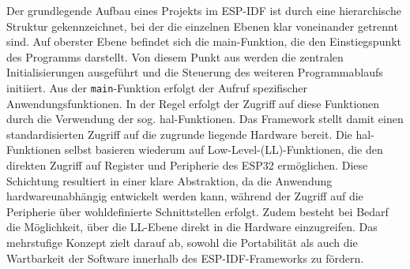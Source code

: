 Der grundlegende Aufbau eines Projekts im ESP-IDF ist durch eine hierarchische Struktur gekennzeichnet, bei der die einzelnen Ebenen klar voneinander getrennt sind.
Auf oberster Ebene befindet sich die main-Funktion, die den Einstiegspunkt des Programms darstellt.
Von diesem Punkt aus werden die zentralen Initialisierungen ausgeführt und die Steuerung des weiteren Programmablaufs initiiert.
Aus der \texttt{main}-Funktion erfolgt der Aufruf spezifischer Anwendungsfunktionen.
In der Regel erfolgt der Zugriff auf diese Funktionen durch die Verwendung der sog. \gls{hal}-Funktionen.
Das Framework stellt damit einen standardisierten Zugriff auf die zugrunde liegende Hardware bereit.
Die \gls{hal}-Funktionen selbst basieren wiederum auf Low-Level-(LL)-Funktionen, die den direkten Zugriff auf Register und Peripherie des ESP32 ermöglichen.
Diese Schichtung resultiert in einer klare Abstraktion, da die Anwendung hardwareunabhängig entwickelt werden kann, während der Zugriff auf die Peripherie über wohldefinierte Schnittstellen erfolgt.
Zudem besteht bei Bedarf die Möglichkeit, über die LL-Ebene direkt in die Hardware einzugreifen.
Das mehrstufige Konzept zielt darauf ab, sowohl die Portabilität als auch die Wartbarkeit der Software innerhalb des ESP-IDF-Frameworks zu fördern.









































